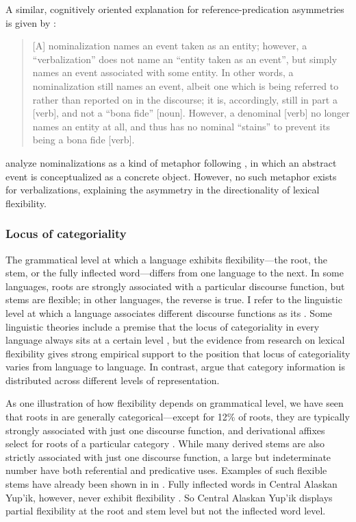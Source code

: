 A similar, cognitively oriented explanation for reference-predication asymmetries is given by \textcite[745]{HopperThompson1984}:

\blockquote[{\cite[745]{HopperThompson1984}}]{[A] nominalization names an event taken as an entity; however, a \enquote{verbalization} does not name an \enquote{entity taken as an event}, but simply names an event associated with some entity. In other words, a nominalization still names an event, albeit one which is being referred to rather than reported on in the discourse; it is, accordingly, still in part a [verb], and not a \enquote{bona fide} [noun]. However, a denominal [verb] no longer names an entity at all, and thus has no nominal \enquote{stains} to prevent its being a bona fide [verb].}

\noindent\textcite[746]{HopperThompson1984} analyze nominalizations as a kind of metaphor following \textcite[3a]{LakoffJohnson1980}, in which an abstract event is conceptualized as a concrete object. However, no such metaphor exists for verbalizations, explaining the asymmetry in the directionality of lexical flexibility.

\subsubsection{Locus of categoriality}
\label{sec:2.3.2.3}

The grammatical level at which a language exhibits flexibility—the root, the stem, or the fully inflected word—differs from one language to the next. In some languages, roots are strongly associated with a particular discourse function, but stems are flexible; in other languages, the reverse is true. I refer to the linguistic level at which a language associates different discourse functions as its . Some linguistic theories include a premise that the locus of categoriality in every language always sits at a certain level \parencites{HalleMarantz1994}{Baker2003}{Baker2015}{BooijAudring2018}{Siddiqi2018}, but the evidence from research on lexical flexibility gives strong empirical support to the position that locus of categoriality varies from language to language. In contrast, \textcite{BlaszczakKlimekJankowskaMigdalski2015} argue that category information is distributed across different levels of representation.

As one illustration of how flexibility depends on grammatical level, we have seen that roots in  are generally categorical—except for 12\% of roots, they are typically strongly associated with just one discourse function, and derivational affixes select for roots of a particular category \parencite[162--167]{Mithun2017}. While many derived stems are also strictly associated with just one discourse function, a large but indeterminate number have both referential and predicative uses. Examples of such flexible stems have already been shown in  in . Fully inflected words in Central Alaskan Yup'ik, however, never exhibit flexibility \parencite[6]{Mithun2019}. So Central Alaskan Yup'ik displays partial flexibility at the root and stem level but not the inflected word level.

